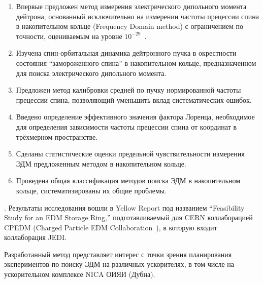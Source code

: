 {\novelty}
\begin{enumerate}
	\item Впервые предложен метод измерения электрического дипольного момента дейтрона,
	 основанный исключительно на измерении частоты прецессии спина в накопительном кольце 
	 (Frequency Domain method) с ограничением по точности, оцениваемым на уровне $10^{-29}$~\ecm.
	\item Изучена спин-орбитальная динамика дейтронного пучка в окрестности состояния ``замороженного спина''
	в накопительном кольце, предназначенном для поиска электрического дипольного момента. 
	\item Предложен метод калибровки средней по пучку нормированной частоты прецессии спина, позволяющий уменьшить вклад систематических ошибок.
	\item Введено определение эффективного значения фактора Лоренца, необходимое для 
	определения зависимости частоты прецессии спина от координат в трёхмерном пространстве. 
	\item Сделаны статистические оценки предельной чувствительности измерения ЭДМ предложенным методом в накопительном кольце. 
	\item Проведена общая классификация методов поиска ЭДМ в накопительном кольце, систематизированы их общие проблемы.
\end{enumerate}

{\influence}. Результаты исследования вошли в Yellow Report под названием 
``Feasibility Study for an EDM Storage Ring,'' подготавливаемый для CERN коллаборацией CPEDM 
(Charged Particle EDM Collaboration~\cite{CPEDM:Website}), в которую входит коллаборация JEDI.




Разработанный метод представляет интерес с точки зрения планирования экспериментов по поиску ЭДМ
 на различных ускорителях, в том числе на ускорительном комплексе NICA ОИЯИ (Дубна).

